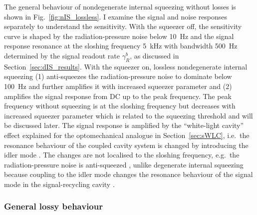 The general behaviour of nondegenerate internal squeezing without losses is shown in Fig.~\ref{fig:nIS_lossless}. I examine the signal and noise responses separately to understand the sensitivity.
With the squeezer off, the sensitivity curve is shaped by the radiation-pressure noise below 10~Hz and the signal response resonance at the sloshing frequency 5~kHz with bandwidth 500~Hz determined by the signal readout rate $\gamma^b_R$, as discussed in Section~\ref{sec:dIS_results}.
With the squeezer on, lossless nondegenerate internal squeezing (1) anti-squeezes the radiation-pressure noise to dominate below 100~Hz and further amplifies it with increased squeezer parameter  and (2) amplifies the signal response from DC up to the peak frequency. The peak frequency without squeezing is at the sloshing frequency but decreases with increased squeezer parameter which is related to the squeezing threshold and will be discussed later.
The signal response is amplified by the ``white-light cavity'' effect explained for the optomechanical analogue in Section~\ref{sec:sWLC}, i.e.\ the resonance behaviour of the coupled cavity system is changed by introducing the idler mode .
The changes are not localised to the sloshing frequency, e.g.\ the radiation-pressure noise is anti-squeezed , unlike degenerate internal squeezing because coupling to the idler mode changes the resonance behaviour of the signal mode in the signal-recycling cavity .


\subsubsection{General lossy behaviour}
\label{sec:nIS_general_behaviour}

